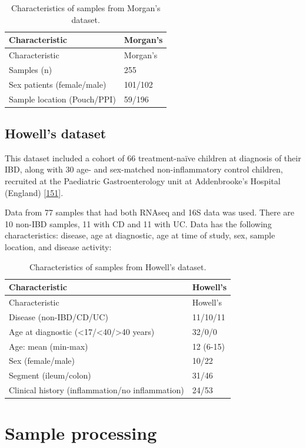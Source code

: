 \documentclass[
  a4paper,
]{book}
\begin{document}
\begin{longtable}[]{@{}ll@{}}
\caption{\label{tab:Morgan} Characteristics of samples from Morgan's dataset.}\tabularnewline
\toprule
Characteristic & Morgan's \\
\midrule
\endfirsthead
\toprule
Characteristic & Morgan's \\
\midrule
\endhead
Samples (n) & 255 \\
Sex patients (female/male) & 101/102 \\
Sample location (Pouch/PPI) & 59/196 \\
\bottomrule
\end{longtable}

\hypertarget{methods-howell}{%
\subsection{Howell's dataset}\label{methods-howell}}

This dataset included a cohort of 66 treatment-naïve children at diagnosis of their IBD, along with 30 age- and sex-matched non-inflammatory control children, recruited at the Paediatric Gastroenterology unit at Addenbrooke's Hospital (England) {[}\protect\hyperlink{ref-howell2018}{151}{]}.

Data from 77 samples that had both RNAseq and 16S data was used.
There are 10 non-IBD samples, 11 with CD and 11 with UC.
Data has the following characteristics: disease, age at diagnostic, age at time of study, sex, sample location, and disease activity:

\begin{longtable}[]{@{}ll@{}}
\caption{\label{tab:howell} Characteristics of samples from Howell's dataset.}\tabularnewline
\toprule
Characteristic & Howell's \\
\midrule
\endfirsthead
\toprule
Characteristic & Howell's \\
\midrule
\endhead
Disease (non-IBD/CD/UC) & 11/10/11 \\
Age at diagnostic (\textless17/\textless40/\textgreater40 years) & 32/0/0 \\
Age: mean (min-max) & 12 (6-15) \\
Sex (female/male) & 10/22 \\
Segment (ileum/colon) & 31/46 \\
Clinical history (inflammation/no inflammation) & 24/53 \\
\bottomrule
\end{longtable}

\hypertarget{processing}{%
\section{Sample processing}\label{processing}}
\end{document}
